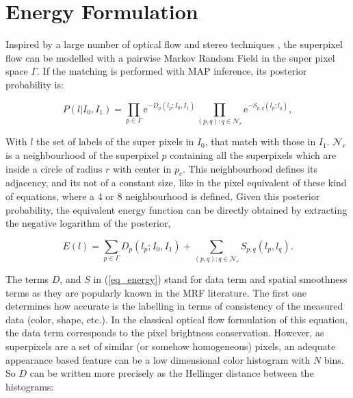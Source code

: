 
\section{Energy Formulation}

Inspired by a large number of optical flow and stereo techniques \cite{c7}\cite{c12}\cite{c13}, 
the superpixel flow can be modelled with a pairwise Markov Random Field in the super pixel space $\Gamma$. If
the matching is performed with MAP inference, its posterior probability is: 

\begin{equation}
P(l|I_0,I_1) = \displaystyle \prod_{p \in \Gamma} \mathrm{e}^{-D_p(l_p;I_0,I_1)} 
\prod_{(p,q): q \in \mathcal{N}_r} \mathrm{e}^{-S_{p,q}(l_p;l_q)} ,
\label{eq_prob}
\end{equation}

With $l$ the set of labels of the super pixels in $I_0$,
that match with those in $I_1$.
$ \mathcal{N}_r $ is a neighbourhood of the
superpixel $p$ containing all the superpixels which are inside a circle of radius $r$ with center in $p_c$. This neighbourhood defines its adjacency, and its not of a constant size, like in the pixel 
equivalent of these kind of equations, where a 4 or 8 neighbourhood is defined.  
Given this posterior probability, the equivalent energy function can be directly obtained
by extracting the negative logarithm of the posterior,

\begin{equation}
E(l) = \displaystyle \sum_{p \in \Gamma} D_p(l_p;I_0,I_1) +
\sum_{(p,q): q \in \mathcal{N}_r} S_{p,q}(l_p,l_q) .
\label{eq_energy}
\end{equation}

The terms $D$, and $S$ in (\ref{eq_energy}) stand for data term and spatial smoothness terms as they
are popularly known in the MRF literature. The first one determines how accurate is the labelling in terms
of consistency of the measured data (color, shape, etc.). In the classical optical flow formulation of this equation,
the data term corresponds to the pixel brightness conservation\cite{c7}\cite{c5}. However, as superpixels are a set
of similar (or somehow homogeneous) pixels, an adequate appearance based feature can be a low dimensional
color histogram with $N$ bins. So $D$ can be written more precisely as the Hellinger distance between the histograms:

